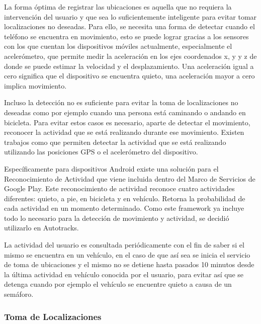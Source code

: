 La forma óptima de registrar las ubicaciones es aquella que no requiera la intervención del usuario y que sea lo suficientemente inteligente para evitar tomar localizaciones no deseadas. Para ello, se necesita una forma de detectar cuando el teléfono se encuentra en movimiento, esto se puede lograr gracias a los sensores con los que cuentan los dispositivos móviles actualmente, especialmente el acelerómetro, que permite medir la aceleración en los ejes coordenados x, y y z de donde se puede estimar la velocidad y el desplazamiento. Una aceleración igual a cero significa que el dispositivo se encuentra quieto, una aceleración mayor a cero implica movimiento.

Incluso la detección no es suficiente para evitar la toma de localizaciones no deseadas como por ejemplo cuando una persona está caminando o andando en bicicleta. Para evitar estos casos es necesario, aparte de detectar el movimiento, reconocer la actividad que se está realizando durante ese movimiento. Existen trabajos como \cite{liao2006location,bao2004activity,ravi2005activity} que permiten detectar la actividad que se está realizando utilizando las posiciones GPS o el acelerómetro del dispositivo.

Específicamente para dispositivos Android existe una solución para el Reconocimiento de Actividad que  viene incluida dentro del Marco de Servicios de Google Play. Este reconocimiento de actividad reconoce cuatro actividades diferentes: quieto, a pie, en bicicleta y en vehículo. Retorna la probabilidad de cada actividad en un momento determinado. Como este framework ya incluye todo lo necesario para la detección de movimiento y actividad, se decidió utilizarlo en Autotracks.

La actividad del usuario es consultada periódicamente con el fin de saber si el mismo se encuentra en un vehículo, en el caso de que así sea se inicia el servicio de toma de ubicaciones y el mismo no se detiene hasta pasados 10 minutos desde la última actividad en vehículo conocida por el usuario, para evitar así que se detenga cuando por ejemplo el vehículo se encuentre quieto a causa de un semáforo. 

\subsubsection{Toma de Localizaciones}

